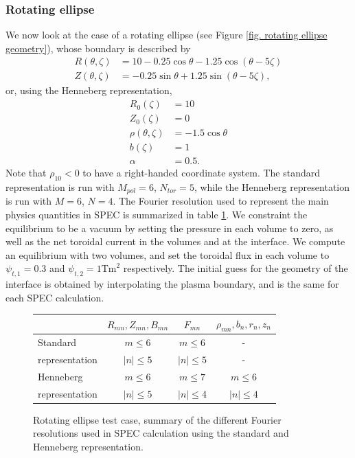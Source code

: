 \documentclass[my_thesis.tex]{subfiles}
\begin{document}
\subsubsection{Rotating ellipse}
We now look at the case of a rotating ellipse (see Figure \ref{fig. rotating ellipse geometry}), whose boundary is described by
\begin{align}
	R(\theta,\zeta) &= 10 - 0.25\cos\theta - 1.25\cos(\theta-5\zeta)\\
	Z(\theta,\zeta) &= -0.25\sin\theta + 1.25\sin(\theta-5\zeta),
\end{align}
or, using the Henneberg representation, 
\begin{align}
	R_0(\zeta) &= 10\\
	Z_0(\zeta) &= 0\\
	\rho(\theta,\zeta) &= -1.5\cos\theta\\
	b(\zeta) &= 1\\
	\alpha &= 0.5.
\end{align}
Note that $\rho_{10}<0$ to have a right-handed coordinate system. The standard representation is run with $M_{pol}=6$, $N_{tor}=5$, while the Henneberg representation is run with $M=6$, $N=4$. The Fourier resolution used to represent the main physics quantities in SPEC is summarized in table \ref{tab. ellipse res}. We constraint the equilibrium to be a vacuum by setting the pressure in each volume to zero, as well as the net toroidal current in the volumes and at the interface. We compute an equilibrium with two volumes, and set the toroidal flux in each volume to $\psi_{t,1}=0.3$ and $\psi_{t,2}=1\text{Tm}^2$ respectively. The initial guess for the geometry of the interface is obtained by interpolating the plasma boundary, and is the same for each SPEC calculation.


\begin{figure}
	\centering
	\begin{tabular}{l|c|c|c|}
		    & $R_{mn},Z_{mn},B_{mn}$ & $F_{mn}$ & $\rho_{mn},b_n,r_n,z_n$ \\
		\hline
		Standard &  $m\leq 6$ & $m\leq 6$ & - \\
		representation	& $|n|\leq 5$ & $|n|\leq 5$ & - \\
		\hline
		Henneberg & $m\leq 6$ & $m\leq 7$ & $m\leq 6$\\
		representation & $|n|\leq 5$ & $|n|\leq 4$ & $|n|\leq 4$
	\end{tabular}
	\caption{Rotating ellipse test case, summary of the different Fourier resolutions used in SPEC calculation using the standard and Henneberg representation.}
	\label{tab. ellipse res}
\end{figure}
\end{document}

